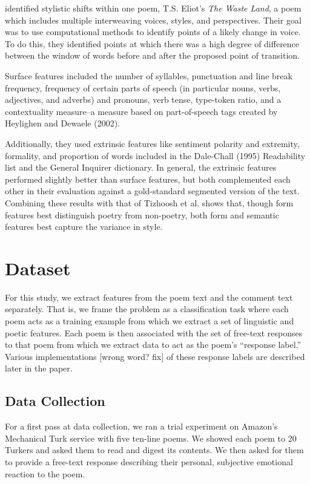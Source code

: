 \documentclass[11pt]{article}
\begin{document}
 identified stylistic shifts within one poem, T.S. Eliot’s \emph{The Waste Land}, a poem which includes multiple interweaving voices, styles, and perspectives. Their goal was to use computational methods to identify points of a likely change in voice. To do this, they identified points at which there was a high degree of difference between the window of words before and after the proposed point of transition.

Surface features included the number of syllables, punctuation and line break frequency, frequency of certain parts of speech (in particular nouns, verbs, adjectives, and adverbs) and pronouns, verb tense, type-token ratio, and a contextuality measure–a measure based on part-of-speech tags created by Heylighen and Dewaele (2002).

Additionally, they used extrinsic features like sentiment polarity and extremity, formality, and proportion of words included in the Dale-Chall (1995) Readability list and the General Inquirer dictionary. In general, the extrinsic features performed slightly better than surface features, but both complemented each other in their evaluation against a gold-standard segmented version of the text. Combining these results with that of Tizhoosh et al. shows that, though form features best distinguish poetry from non-poetry, both form and semantic features best capture the variance in style.

\section{Dataset}
For this study, we extract features from the poem text and the comment text separately. That is, we frame the problem as a classification task where each poem acts as a training example from which we extract a set of linguistic and poetic features. Each poem is then associated with the set of free-text responses to that poem from which we extract data to act as the poem's ``response label.'' Various implementations [wrong word? fix] of these response labels are described later in the paper.

\subsection{Data Collection}
For a first pass at data collection, we ran a trial experiment on Amazon's Mechanical Turk service with five ten-line poems. We showed each poem to 20 Turkers and asked them to read and digest its contents. We then asked for them to provide a free-text response describing their personal, subjective emotional reaction to the poem. 
\end{document}
